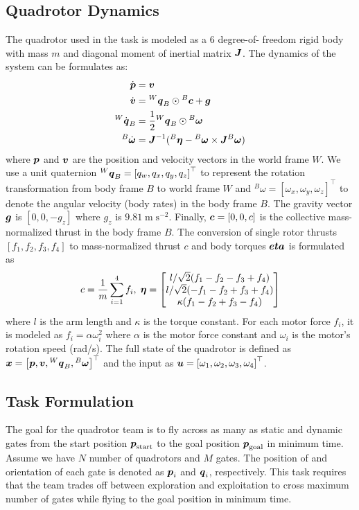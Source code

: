 \documentclass[letterpaper,journal,twoside]{IEEEtran}
\begin{document}
\subsection{Quadrotor Dynamics}
The quadrotor used in the task is modeled as a 6 degree-of-
freedom rigid body with mass $m$ and diagonal moment of 
inertial matrix $\boldsymbol{J}$.
The dynamics of the system can be formulates as: 
\[
\begin{aligned}
  \dot{\boldsymbol{p}} &= \boldsymbol{v}
  \\  
  \dot{\boldsymbol{v}} &= {}^W\boldsymbol{q}_B \odot {}^B\boldsymbol{c} + \boldsymbol{g}
  \\
  {}^W\dot{\boldsymbol{q}}_B &= \frac{1}{2} {}^W\boldsymbol{q}_B \odot {}^B\boldsymbol{\omega}
  \\
  {}^B\dot{\boldsymbol{\omega}} &= 
  \boldsymbol{J}^{-1}({}^B\boldsymbol{\eta} - {}^B\boldsymbol{\omega} \times \boldsymbol{J}{}^B\boldsymbol{\omega})
\end{aligned}
\]
where $\boldsymbol{p}$ and $\boldsymbol{v}$ are the position and velocity 
vectors in the world frame $W$. 
We use a unit quaternion 
${}^W\boldsymbol{q}_B = \left[q_w, q_x, q_y, q_z\right]^\top$ 
to represent the rotation transformation from body frame 
$B$ to world frame $W$
and 
${}^B\omega = \left[\omega_x, \omega_y, \omega_z\right]^\top$ to denote the angular velocity (body rates) in the 
body frame $B$.
The gravity vector $\boldsymbol{g}$ is $\left[0,0,-g_z\right]$ where
$g_z$ is $9.81\;\text{m}\;\text{s}^{-2}$.
Finally, $\boldsymbol{c} = \left[0,0,c\right]$ is the collective 
mass-normalized thrust in the body frame $B$. 
The conversion of single rotor thrusts 
$\left[f_1, f_2, f_3, f_4\right]$ to 
mass-normalized thrust $c$ 
and body torques $\boldsymbol{eta}$ is formulated as
\[
  c = \frac{1}{m}\sum_{i=1}^4 f_i,\;
  \boldsymbol{\eta} = 
  \begin{bmatrix}
    l/\sqrt{2}(f_1 - f_2 - f_3 + f_4) \\
    l/\sqrt{2}(-f_1 - f_2 + f_3 + f_4) \\
    \kappa(f_1 - f_2 + f_3 - f_4)
  \end{bmatrix}
\]
where $l$ is the arm length and $\kappa$ is the torque 
constant.
For each motor force $f_i$, it is modeled as 
$f_i = \alpha \omega_i^2$ where $\alpha$ is the motor 
force constant and $\omega_i$ is the motor's rotation speed
(rad/s).
The full state of the quadrotor is defined as 
$\boldsymbol{x} = \left[\boldsymbol{p}, \boldsymbol{v}, {}^W{\boldsymbol{q}}_B, 
{}^B\boldsymbol{\omega}\right]^\top$ and the input as 
$\boldsymbol{u} = \left[\omega_1, \omega_2, \omega_3, 
\omega_4\right]^\top$.

\subsection{Task Formulation}
The goal for the quadrotor team is to fly across as many as 
static and dynamic gates from the start position 
$\boldsymbol{p}_\text{start}$ to the goal position 
$\boldsymbol{p}_\text{goal}$ in minimum time. 
Assume we have $N$ number of quadrotors and $M$ gates. 
The position of and orientation of each gate is denoted 
as $\boldsymbol{p}_i$ and $\boldsymbol{q}_i$, respectively.
This task requires that the team trades off between 
exploration and exploitation to cross maximum number of 
gates while flying to the goal position in minimum time.



\end{document}
